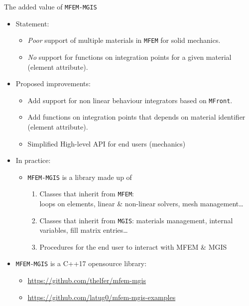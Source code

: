 \documentclass{beamer}
\begin{document}
\begin{frame}[fragile]{The
    added value of \texttt{MFEM-MGIS}}
  \begin{itemize}
    \item Statement:
    \begin{itemize}
      \item \emph{Poor} support of multiple materials in
      \texttt{MFEM} for solid mechanics.
      \item \emph{No} support for functions on integration
      points for a given material (element attribute).
    \end{itemize}
    \item Proposed improvements:
    \begin{itemize}
      \item Add support for non linear behaviour integrators
      based on \texttt{MFront}.
      \item Add functions on integration points that depends on
      material identifier (element attribute).
      \item Simplified High-level API for end users (mechanics)
    \end{itemize}
    \item<2-> In practice:
    \begin{itemize}
      \item \texttt{MFEM-MGIS} is a library made up of
      \begin{enumerate}
        
        \item Classes that inherit from \texttt{MFEM}:\\ loops
        on elements, linear \& non-linear solvers, mesh management\ldots{}
        \item Classes that inherit from \texttt{MGIS}:
        materials management, internal variables, fill matrix
        entries\ldots{}
        \item Procedures for the end user to interact with MFEM
        \& MGIS
      \end{enumerate}
    \end{itemize}
    \item<3-> \texttt{MFEM-MGIS} is a C++17 opensource library:
    \begin{itemize}
      \item \url{https://github.com/thelfer/mfem-mgis}
      \item \url{https://github.com/latug0/mfem-mgis-examples}
    \end{itemize}
  \end{itemize}
\end{frame}
\end{document}
